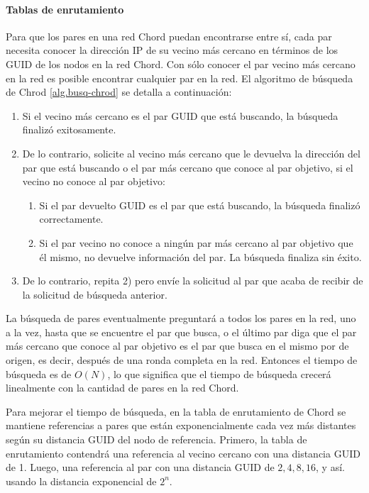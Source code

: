  
 \paragraph{Tablas de enrutamiento}
 
 Para que los pares en una red Chord puedan encontrarse entre sí, cada par necesita conocer  la dirección IP   de su vecino más cercano en términos de los  GUID de los nodos en la red Chord.  
Con sólo conocer el par vecino más cercano en la red es posible encontrar cualquier par en la red. El algoritmo de búsqueda de Chrod \ref{alg.busq-chrod} se detalla a continuaci\'on:
 

\begin{enumerate}
	\item  Si el vecino más cercano es el par GUID que está buscando, la búsqueda finalizó exitosamente.
	
	\item De lo contrario, solicite al vecino más cercano que le devuelva la dirección del par que está buscando o el par más cercano que conoce al par objetivo, si el vecino no conoce al par objetivo:
	\begin{enumerate}
		\item Si el par devuelto GUID es el par que está buscando, la búsqueda finalizó correctamente.
		
		\item Si el par vecino no conoce a ningún par más cercano al par objetivo que él mismo, no devuelve información del par. La búsqueda finaliza sin éxito.
	\end{enumerate}	
	
	\item De lo contrario, repita 2) pero envíe la solicitud al par que acaba de recibir de la solicitud de búsqueda anterior.
	
\end{enumerate}

	
La búsqueda de pares eventualmente preguntará a todos los pares en la red, uno a la vez, hasta que se encuentre el par que busca, o el último par diga que el par más cercano que conoce al par objetivo es el par que busca en el mismo por de origen, es decir, después de una ronda completa en la red.
Entonces el tiempo de búsqueda es de $O(N)$, lo que significa que el tiempo de búsqueda crecerá linealmente con la cantidad de pares en la red Chord.  

Para mejorar el tiempo de búsqueda, en la tabla de enrutamiento de Chord se mantiene referencias a pares que están exponencialmente cada vez más distantes según su distancia GUID del nodo de referencia. Primero, la tabla de enrutamiento contendrá una referencia al vecino cercano  con una distancia GUID de 1. Luego, una referencia al par con una distancia GUID de $2,  4,  8,  16$, y as\'i. usando la distancia exponencial de $2^{n}$.

